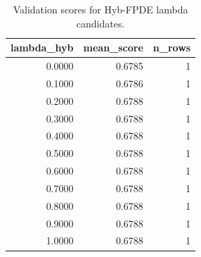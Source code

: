 \begin{table}[t]
\caption{Validation scores for Hyb-FPDE lambda candidates.}
\label{tab:lambda_distribution_computed}
\centering
\begin{tabular}{rrr}
\toprule
lambda\_hyb & mean\_score & n\_rows \\
\midrule
0.0000 & 0.6785 & 1 \\
0.1000 & 0.6786 & 1 \\
0.2000 & 0.6788 & 1 \\
0.3000 & 0.6788 & 1 \\
0.4000 & 0.6788 & 1 \\
0.5000 & 0.6788 & 1 \\
0.6000 & 0.6788 & 1 \\
0.7000 & 0.6788 & 1 \\
0.8000 & 0.6788 & 1 \\
0.9000 & 0.6788 & 1 \\
1.0000 & 0.6788 & 1 \\
\bottomrule
\end{tabular}

\end{table}
